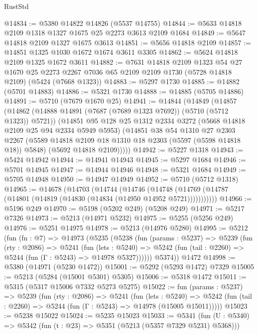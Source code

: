 \begin{lexlean}{RustStd}
\begin{coremodule}
@14834 := @5380 @14822 @14826 (@5537 @14755)
@14844 := @5633 @14818 @2109 @1318 @1327 @1675 @25 @2273 @3613 @2109 @1684
@14849 := @5647 @14818 @2109 @1327 @1675 @3613
@14851 := @5656 @14818 @2109
@14857 := @14851 @1325 @1030 @1672 @1674 @3611 @3305
@14862 := @5624 @14818 @2109 @1325 @1672 @3611
@14882 := @7631
    @14818
    @2109
    @1323
    @54
    @27
    @1670
    @25
    @2273
    @2267
    @7036
    @65
    @2109
    @2109
    @1730
    (@5728 @14818 @2109)
    (@5424 (@7668 @1323))
@14883 := @5297 @1730
@14885 := @14882 (@5701 @14883)
@14886 := @5321 @1730
@14888 := @14885 (@5705 @14886)
@14891 := @5710 (@7679 @1670 @25)
@14941 := @14844
    (@14849
      (@14857
        (@14862 (@14888 @14891 (@7687 (@7689 @1323 @7692)) (@5710 (@5712 @1323)) @5721))
        (@14851
          @95
          @128
          @25
          @1312
          @2334
          @3272
          (@5668 @14818 @2109 @25 @94 @2334 @5949 @5953)
          (@14851
            @38
            @54
            @1310
            @27
            @2303
            @2267
            (@5589 @14818 @2109 @18 @1310 @18 @2303 (@5597 (@5598 @14818 @18)) @5848)
            (@5692 @14818 @2109)))))
@14942 := @5227 @1318
@14943 := @5424 @14942
@14944 := @14941 @14943
@14945 := @5297 @1684
@14946 := @5701 @14945
@14947 := @14944 @14946
@14948 := @5321 @1684
@14949 := @5705 @14948
@14950 := @14947 @14949
@14952 := @5710 (@5712 @1318)
@14965 := @14678
    (@14703
      (@14744
        (@14746
          (@14748 (@14769 (@14787 (@14801 (@14819 (@14830 (@14834 (@14950 @14952 @5721)))))))))))
@14966 := @5196 @249
@14970 := @5198 (@5202 @249) (@5208 @249)
@14971 := @5217 @7326
@14973 := @5213 (@14971 @5232)
@14975 := @5255 (@5256 @249)
@14976 := @5251 @14975
@14978 := @5213 (@14976 @5280)
@14995 := @5212
    (fun (fn : @7) =>
    @14973
      (@5235
        (@5238
          (fun (params : @5237) =>
          @5239
            (fun (rty : @2086) =>
            @5241
              (fun (lets : @5240) =>
              @5242 (fun (tail : @2260) => @5244 (fun (Γ : @5243) => @14978 @5327))))))
        @5374))
    @1472
@14998 := @5380 (@14971 (@5230 @1472))
@15001 := @5292 (@5293 @1472) @7329
@15005 := @5213 (@5284 (@15001 @5301) @5305)
@15006 := @5318 @1472
@15011 := @5315 (@5317 @15006 @7332 @5273 @5275)
@15022 := fun (params : @5237) =>
  @5239
    (fun (rty : @2086) =>
    @5241
      (fun (lets : @5240) =>
      @5242 (fun (tail : @2260) => @5244 (fun (Γ : @5243) => @14978 (@15005 @15011)))))
@15023 := @5238 @15022
@15024 := @5235 @15023
@15033 := @5341
    (fun (U : @5340) => @5342 (fun (t : @23) => @5351 (@5213 (@5357 @7329 @5231) @5368)))

\end{coremodule}
\end{lexlean}
